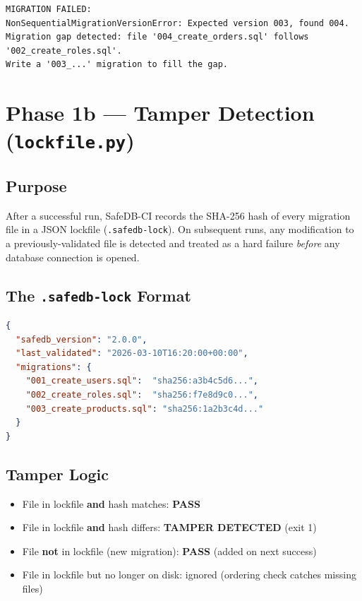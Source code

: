 \documentclass[12pt,a4paper]{report}
\begin{document}
\begin{lstlisting}
MIGRATION FAILED:
NonSequentialMigrationVersionError: Expected version 003, found 004.
Migration gap detected: file '004_create_orders.sql' follows '002_create_roles.sql'.
Write a '003_...' migration to fill the gap.
\end{lstlisting}

\section{Phase 1b — Tamper Detection (\texttt{lockfile.py})}

\subsection{Purpose}

After a successful run, SafeDB-CI records the SHA-256 hash of every migration
file in a JSON lockfile (\texttt{.safedb-lock}). On subsequent runs, any
modification to a previously-validated file is detected and treated as a hard
failure \emph{before} any database connection is opened.

\subsection{The \texttt{.safedb-lock} Format}

\begin{lstlisting}[language=json, caption={.safedb-lock example}]
{
  "safedb_version": "2.0.0",
  "last_validated": "2026-03-10T16:20:00+00:00",
  "migrations": {
    "001_create_users.sql":  "sha256:a3b4c5d6...",
    "002_create_roles.sql":  "sha256:f7e8d9c0...",
    "003_create_products.sql": "sha256:1a2b3c4d..."
  }
}
\end{lstlisting}

\subsection{Tamper Logic}

\begin{itemize}
  \item File in lockfile \textbf{and} hash matches: \textcolor{safegreen}{\textbf{PASS}}
  \item File in lockfile \textbf{and} hash differs: \textcolor{safered}{\textbf{TAMPER DETECTED}} (exit 1)
  \item File \textbf{not} in lockfile (new migration): \textcolor{safegreen}{\textbf{PASS}} (added on next success)
  \item File in lockfile but no longer on disk: ignored (ordering check catches missing files)
\end{itemize}
\end{document}

